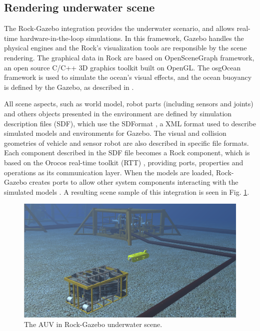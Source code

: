 \documentclass[final,5p,times]{elsarticle}
\begin{document}

\subsection{Rendering underwater scene}
\label{dev:uwscene}

The Rock-Gazebo integration \cite{watanabe2015} provides the underwater scenario, and allows real-time hardware-in-the-loop simulations. In this framework, Gazebo handles the physical engines and the Rock's visualization tools are responsible by the scene rendering. The graphical data in Rock are based on OpenSceneGraph framework, an open source C/C++ 3D graphics toolkit built on OpenGL. The osgOcean framework is used to simulate the ocean's visual effects, and the ocean buoyancy is defined by the Gazebo, as described in \cite{watanabe2015}.

All scene aspects, such as world model, robot parts (including sensors and joints) and others objects presented in the environment are defined by simulation description files (SDF), which use the SDFormat \cite{sdformat2017}, a XML format used to describe simulated models and environments for Gazebo. The visual and collision geometries of vehicle and sensor robot are also described in specific file formats. Each component described in the SDF file becomes a Rock component, which is based on the Orocos real-time toolkit (RTT) \cite{soetens2005}, providing ports, properties and operations as its communication layer. When the models are loaded, Rock-Gazebo creates ports to allow other system components interacting with the simulated models \cite{cerqueira2016}. A resulting scene sample of this integration is seen in Fig. \ref{fig:uwscene}.

\begin{figure}[t]
    \includegraphics[width=\columnwidth]{figs/uwscene}
    \centering
    \captionsetup{justification=centering}
    \caption{The AUV in Rock-Gazebo underwater scene.}
    \label{fig:uwscene}
\end{figure}
\end{document}
